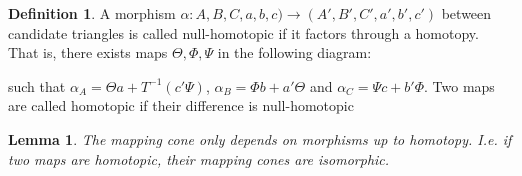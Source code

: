 \documentclass[11pt]{article}
\newtheorem{lemma}[theorem]{Lemma}
\theoremstyle{definition}
\newtheorem{definition}{Definition}[section]
\theoremstyle{remark}
\begin{document}
            \begin{definition}
                A morphism $\alpha : A,B,C,a,b,c) \rightarrow (A',B',C',a',b',c')$ between candidate triangles is called null-homotopic if it factors through a homotopy. That is, there exists maps $\Theta, \Phi, \Psi$ in the following diagram:
                \begin{center}
                \end{center}
                such that $\alpha_A  = \Theta a + T^{-1}(c'\Psi)$, $\alpha_B = \Phi b + a'\Theta$ and $\alpha_C = \Psi c + b'\Phi$.
                Two maps are called homotopic if their difference is null-homotopic
            \end{definition}

            \begin{lemma}
                The mapping cone only depends on morphisms up to homotopy. I.e. if two maps are homotopic, their mapping cones are isomorphic.
            \end{lemma}
\end{document}
